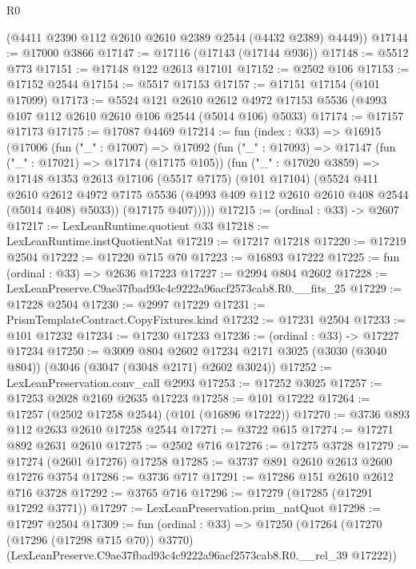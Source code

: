 \begin{lexlean}{R0}
\begin{coremodule}
      (@4411 @2390 @112 @2610 @2610 @2389 @2544 (@4432 @2389) @4449))
@17144 := @17000 @3866
@17147 := @17116 (@17143 (@17144 @936))
@17148 := @5512 @773
@17151 := @17148 @122 @2613 @17101
@17152 := @2502 @106
@17153 := @17152 @2544
@17154 := @5517 @17153
@17157 := @17151 @17154 (@101 @17099)
@17173 := @5524
    @121
    @2610
    @2612
    @4972
    @17153
    @5536
    (@4993 @107 @112 @2610 @2610 @106 @2544 (@5014 @106) @5033)
@17174 := @17157 @17173
@17175 := @17087 @4469
@17214 := fun (index : @33) =>
  @16915
    (@17006
      (fun ("_" : @17007) =>
      @17092
        (fun ("_" : @17093) =>
        @17147
          (fun ("_" : @17021) => @17174 (@17175 @105))
          (fun ("_" : @17020 @3859) =>
          @17148
            @1353
            @2613
            @17106
            (@5517 @7175)
            (@101 @17104)
            (@5524
              @411
              @2610
              @2612
              @4972
              @7175
              @5536
              (@4993 @409 @112 @2610 @2610 @408 @2544 (@5014 @408) @5033))
            (@17175 @407)))))
@17215 := (ordinal : @33) -> @2607
@17217 := LexLeanRuntime.quotient @33
@17218 := LexLeanRuntime.instQuotientNat
@17219 := @17217 @17218
@17220 := @17219 @2504
@17222 := @17220 @715 @70
@17223 := @16893 @17222
@17225 := fun (ordinal : @33) => @2636 @17223
@17227 := @2994 @804 @2602
@17228 := LexLeanPreserve.C9ae37fbad93c4c9222a96acf2573cab8.R0.__fits_25
@17229 := @17228 @2504
@17230 := @2997 @17229
@17231 := PrismTemplateContract.CopyFixtures.kind
@17232 := @17231 @2504
@17233 := @101 @17232
@17234 := @17230 @17233
@17236 := (ordinal : @33) -> @17227 @17234
@17250 := @3009
    @804
    @2602
    @17234
    @2171
    @3025
    (@3030 (@3040 @804))
    (@3046 (@3047 (@3048 @2171) @2602 @3024))
@17252 := LexLeanPreservation.conv_call @2993
@17253 := @17252 @3025
@17257 := @17253 @2028 @2169 @2635 @17223
@17258 := @101 @17222
@17264 := @17257 (@2502 @17258 @2544) (@101 (@16896 @17222))
@17270 := @3736 @893 @112 @2633 @2610 @17258 @2544
@17271 := @3722 @615
@17274 := @17271 @892 @2631 @2610
@17275 := @2502 @716
@17276 := @17275 @3728
@17279 := @17274 (@2601 @17276) @17258
@17285 := @3737 @891 @2610 @2613 @2600 @17276 @3754
@17286 := @3736 @717
@17291 := @17286 @151 @2610 @2612 @716 @3728
@17292 := @3765 @716
@17296 := @17279 (@17285 (@17291 @17292 @3771))
@17297 := LexLeanPreservation.prim_natQuot
@17298 := @17297 @2504
@17309 := fun (ordinal : @33) =>
  @17250
    (@17264
      (@17270 (@17296 (@17298 @715 @70)) @3770)
      (LexLeanPreserve.C9ae37fbad93c4c9222a96acf2573cab8.R0.__rel_39 @17222))

\end{coremodule}
\end{lexlean}
